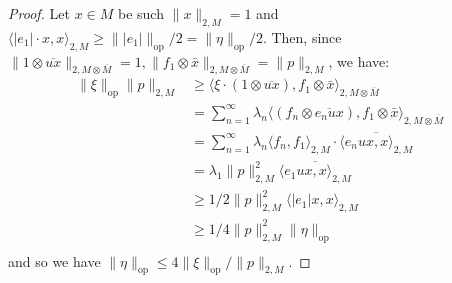 \documentclass[11pt]{amsart}
\DeclareMathOperator{\op}{op}
\theoremstyle{definition}
\theoremstyle{remark}
\theoremstyle{definition}
\newcommand{\iti}[1]{{\begingroup\color{blue}Itamar: #1\endgroup}}
\begin{document}
\begin{proof}
    Let $x \in M$ be such $\| x \|_{2,M}  = 1$ and $\langle |e_1| \cdot x, x \rangle_{2,M}  \geq \||e_1|\|_{\op}/2 = \| \eta \|_{\op} / 2$. Then, since $\|1\otimes \overline{ux} \|_{2,M\otimes \overline M}   = 1,  \| f_1 \otimes \bar x \|_{2, M \otimes \overline{M}}   = \| p \|_{2, M}$, we have:
    \begin{align*}
        \|\xi \|_{\op} \| p \|_{2,M}&\geq\langle\xi \cdot (1\otimes \overline{ux}), f_1 \otimes \bar x \rangle_{2, M \otimes \overline M} \\
        &= \sum_{n=1}^\infty \lambda_n\langle (f_n  \otimes \overline{e_n ux}), f_1 \otimes \bar x \rangle_{2, M \otimes \overline M} \\
        &= \sum_{n=1}^\infty \lambda_n\langle f_n, f_1 \rangle_{2, M}\cdot  \overline{\langle e_n ux,  x \rangle_{2, M }} \\
        &= \lambda_1 \| p \|_{2,M}^2 \overline{\langle e_1 ux,  x \rangle_{2, M }} \\
        &\geq 1/2 \| p \|_{2,M}^2 \langle |e_1| x,  x \rangle_{2, M } \\
        &\geq 1/4 \| p \|_{2,M}^2 \|\eta\|_{\op}\\
    \end{align*}
    and so we have $\| \eta \|_{\op} \leq 4 \|\xi \|_{\op} / \| p \|_{2,M}$.
    

\end{proof}
\end{document}
